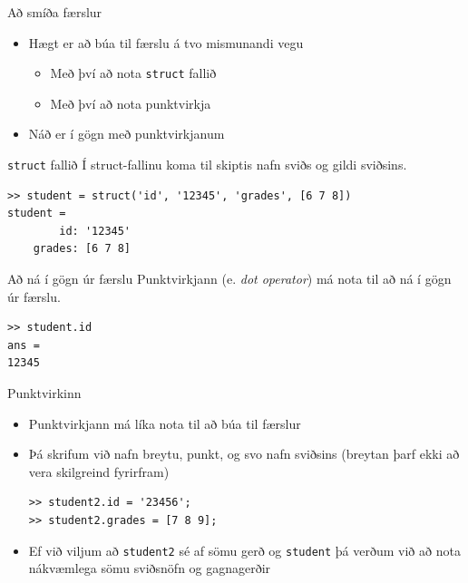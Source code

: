 \documentclass{beamer}
\begin{document}
\begin{frame}{Að smíða færslur}
\begin{itemize}
 \item Hægt er að búa til færslu á tvo mismunandi vegu
 \begin{itemize}
  \item Með því að nota \texttt{struct} fallið
  \item Með því að nota punktvirkja
 \end{itemize}
 \item Náð er í gögn með punktvirkjanum
\end{itemize}
\end{frame}

\begin{frame}[fragile]{\texttt{struct} fallið}
Í struct-fallinu koma til skiptis nafn sviðs og gildi sviðsins.
\begin{verbatim}
>> student = struct('id', '12345', 'grades', [6 7 8])
student = 
        id: '12345'
    grades: [6 7 8]
\end{verbatim}
\end{frame}

\begin{frame}[fragile]{Að ná í gögn úr færslu}
Punktvirkjann (e. \emph{dot operator}) má nota til að ná í gögn úr færslu.
\begin{verbatim}
>> student.id
ans =
12345
\end{verbatim}
\end{frame}

\begin{frame}[fragile]{Punktvirkinn}
\begin{itemize}
 \item Punktvirkjann má líka nota til að búa til færslur
 \item Þá skrifum við nafn breytu, punkt, og svo nafn sviðsins (breytan þarf ekki að vera skilgreind fyrirfram)
\begin{verbatim}
>> student2.id = '23456';
>> student2.grades = [7 8 9];
\end{verbatim}
 \item Ef við viljum að \texttt{student2} sé af sömu gerð og \texttt{student} þá verðum við að nota nákvæmlega sömu sviðsnöfn og gagnagerðir
\end{itemize}
\end{frame}
\end{document}
